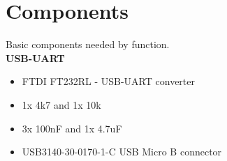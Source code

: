 \section{Components}

Basic components needed by function.
\\
{\bf USB-UART}
\begin{itemize}
  \item FTDI FT232RL - USB-UART converter
  \item 1x 4k7 and 1x 10k
  \item 3x 100nF and 1x 4.7uF
  \item USB3140-30-0170-1-C USB Micro B connector 
\end{itemize}


  



	
